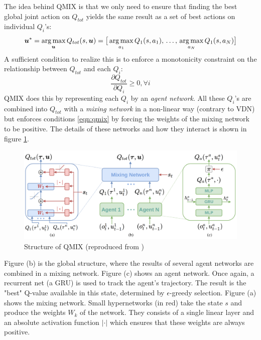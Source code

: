 The idea behind QMIX is that we only need to ensure that finding the best global joint action on $Q_{tot}$ yields the same result as a set of best actions on individual $Q_i$'s:
\begin{equation}
    \bm{u}^* = \operatorname*{arg\,max}_{\bm{u}} Q_{tot}(s, \bm{u}) = \big [ \operatorname*{arg\,max}_{a_1} Q_1(s, a_1), \, \ldots,\, \operatorname*{arg\,max}_{a_N} Q_1(s, a_N) \big ]
\end{equation}
A sufficient condition to realize this is to enforce a monotonicity constraint on the relationship between $Q_{tot}$ and each $Q_i$:
\begin{equation}
    \label{eqn:qmix}
    \frac{\partial Q_{tot}}{\partial Q_i} \geq 0, \forall i
\end{equation}
QMIX does this by representing each $ Q_i$ by an \emph{agent network}. All these $Q_i$'s are combined into $Q_{tot}$ with a \emph{mixing network} in a non-linear way (contrary to VDN) but enforces conditions \ref{eqn:qmix} by forcing the weights of the mixing network to be positive. The details of these networks and how they interact is shown in figure \ref{fig:qmix_structure}.\\

\begin{figure}[htp]
    \centering
    \includegraphics[width=16cm]{images/qmix_structure.png}
    \caption{Structure of QMIX (reproduced from \cite{rashid2018qmix})}
    \label{fig:qmix_structure}
\end{figure}

Figure (b) is the global structure, where the results of several agent networks are combined in a mixing network. Figure (c) shows an agent network. Once again, a recurrent net (a GRU) is used to track the agent's trajectory. The result is the "best" Q-value available in this state, determined by $\epsilon$-greedy selection. Figure (a) shows the mixing network. Small hypernetworks (in red) take the state $s$ and produce the weights $W_k$ of the network. They consists of a single linear layer and an absolute activation function $|\cdot|$ which ensures that these weights are always positive.
